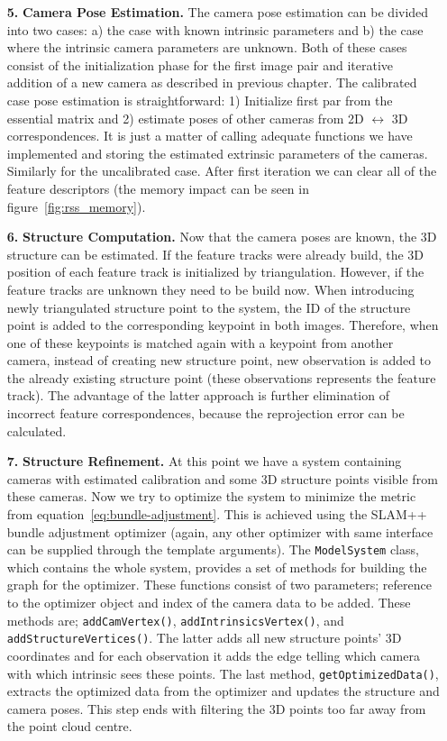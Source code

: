 \begin{itemize}
\item[\textbf{5.}] \textbf{Camera Pose Estimation.}
The camera pose estimation can be divided into two cases: a) the case with known intrinsic parameters and b) the case where the intrinsic camera parameters are unknown. Both of these cases consist of the initialization phase for the first image pair and iterative addition of a new camera as described in previous chapter. The calibrated case pose estimation is straightforward: 1) Initialize first par from the essential matrix and 2) estimate poses of other cameras from 2D $\leftrightarrow$ 3D correspondences. It is just a matter of calling adequate functions we have implemented and storing the estimated extrinsic parameters of the cameras. Similarly for the uncalibrated case. After first iteration we can clear all of the feature descriptors (the memory impact can be seen in figure~\ref{fig:rss_memory}).

\item[\textbf{6.}] \textbf{Structure Computation.}
Now that the camera poses are known, the 3D structure can be estimated. If the feature tracks were already build, the 3D position of each feature track is initialized by triangulation. However, if the feature tracks are unknown they need to be build now. When introducing newly triangulated structure point to the system, the ID of the structure point is added to the corresponding keypoint in both images. Therefore, when one of these keypoints is matched again with a keypoint from another camera, instead of creating new structure point, new observation is added to the already existing structure point (these observations represents the feature track). The advantage of the latter approach is further elimination of incorrect feature correspondences, because the reprojection error can be calculated.

\item[\textbf{7.}]  \textbf{Structure Refinement.} At this point we have a system containing cameras with estimated calibration and some 3D structure points visible from these cameras. Now we try to optimize the system to minimize the metric from equation~\ref{eq:bundle-adjustment}. This is achieved using the SLAM++ bundle adjustment optimizer (again, any other optimizer with same interface can be supplied through the template arguments). The \texttt{ModelSystem} class, which contains the whole system, provides a set of methods for building the graph for the optimizer. These functions consist of two parameters; reference to the optimizer object and index of the camera data to be added. These methods are; \texttt{addCamVertex()}, \texttt{addIntrinsicsVertex()}, and \texttt{addStructureVertices()}. The latter adds all new structure points' 3D coordinates and for each observation it adds the edge telling which camera with which intrinsic sees these points. The last method, \texttt{getOptimizedData()}, extracts the optimized data from the optimizer and updates the structure and camera poses. This step ends with filtering the 3D points too far away from the point cloud centre.

\end{itemize}
